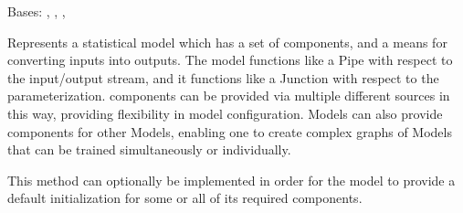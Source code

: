 \documentclass[letterpaper,10pt,english]{sphinxmanual}
\begin{document}
\begin{fulllineitems}
\label{\detokenize{Fireworks:Fireworks.core.model.Model}}
Bases: , {\hyperref[\detokenize{Fireworks:Fireworks.core.pipe.HookedPassThroughPipe}]{}}, {\hyperref[\detokenize{Fireworks:Fireworks.core.junction.Junction}]{}}, 

Represents a statistical model which has a set of components, and a
means for converting inputs into outputs. The model functions like a Pipe
with respect to the input/output stream, and it functions like a Junction
with respect to the parameterization. components can be provided via multiple
different sources in this way, providing flexibility in model configuration.
Models can also provide components for other Models, enabling one to create
complex graphs of Models that can be trained simultaneously or individually.

\begin{fulllineitems}
\label{\detokenize{Fireworks:Fireworks.core.model.Model.init_default_components}}
This method can optionally be implemented in order for the model to provide a default initialization for some or all of its
required components.

\end{fulllineitems}


\begin{fulllineitems}
\label{\detokenize{Fireworks:Fireworks.core.model.Model.update_components}}
\end{fulllineitems}



\end{fulllineitems}
\end{document}
